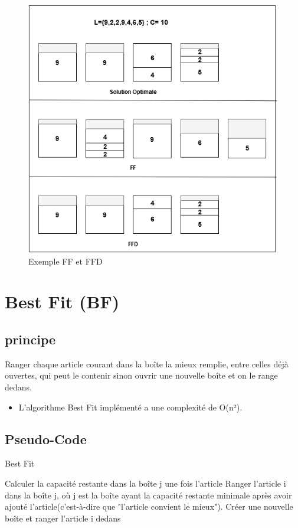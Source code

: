 \documentclass[class=article, crop=false]{standalone}
\begin{document}
\begin{figure}[H]
    \includegraphics[width=\linewidth]{../figures/FF FFD.png}
    \caption{Exemple FF et FFD}
\end{figure}

\section{Best Fit (BF)}
\subsection{principe}
Ranger chaque article courant dans la boîte la mieux remplie, entre celles déjà ouvertes, qui peut le contenir sinon ouvrir une nouvelle boîte et on le range dedans.
\begin{itemize}
    \item L’algorithme Best Fit implémenté a une complexité de O(n²).
\end{itemize}

\subsection{Pseudo-Code}
\begin{algorithm}[H]
    \caption{Best Fit}
    \begin{algorithmic}
              \STATE Calculer la capacité restante dans la boîte j une fois l'article
             \ENDIF 
        \ENDFOR
        \STATE Ranger l’article i dans la boîte j, où j est la boîte ayant la capacité restante minimale après avoir ajouté l’article(c'est-à-dire que "l’article convient le mieux").
            \STATE Créer une nouvelle boîte et ranger l’article i dedans
        \ENDIF
    \ENDFOR
    \end{algorithmic}
\end{algorithm}
\end{document}
